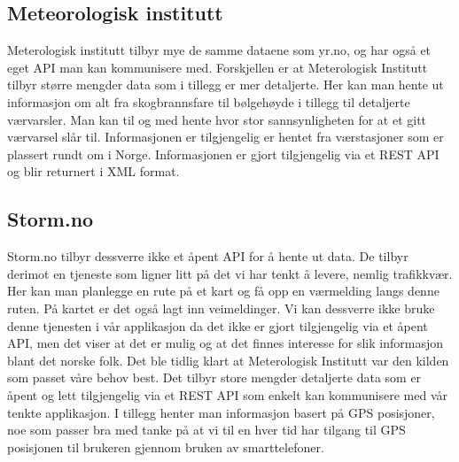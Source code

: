 \documentclass[a4paper,norsk,oneside]{book}
\begin{document}
\subsection{Meteorologisk institutt}
Meterologisk institutt tilbyr mye de samme dataene som yr.no, og har også et eget API man kan kommunisere med. Forskjellen er at Meterologisk Institutt tilbyr større mengder data som i tillegg er mer detaljerte. Her kan man hente ut informasjon om alt fra skogbrannsfare til bølgehøyde i tillegg til detaljerte værvarsler. Man kan til og med hente hvor stor sannsynligheten for at et gitt værvarsel slår til. Informasjonen er tilgjengelig er hentet fra værstasjoner som er plassert rundt om i Norge. Informasjonen er gjort tilgjengelig via et REST API og blir returnert i XML format.

\subsection{Storm.no}
Storm.no tilbyr dessverre ikke et åpent API for å hente ut data. De tilbyr derimot en tjeneste som ligner litt på det vi har tenkt å levere, nemlig trafikkvær. Her kan man planlegge en rute på et kart og få opp en værmelding langs denne ruten. På kartet er det også lagt inn veimeldinger. Vi kan dessverre ikke bruke denne tjenesten i vår applikasjon da det ikke er gjort tilgjengelig via et åpent API, men det viser at det er mulig og at det finnes interesse for slik informasjon blant det norske folk.
Det ble tidlig klart at Meterologisk Institutt var den kilden som passet våre behov best. Det tilbyr store mengder detaljerte data som er åpent og lett tilgjengelig via et REST API som enkelt kan kommunisere med vår tenkte applikasjon. I tillegg henter man informasjon basert på GPS posisjoner, noe som passer bra med tanke på at vi til en hver tid har tilgang til GPS posisjonen til brukeren gjennom bruken av smarttelefoner.
\end{document}
